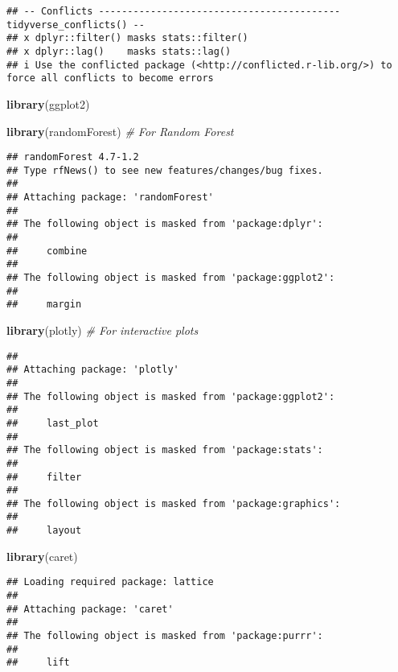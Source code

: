 \documentclass[
]{article}
\newenvironment{Shaded}{\begin{snugshade}}{\end{snugshade}}
\newcommand{\CommentTok}[1]{\textcolor[rgb]{0.56,0.35,0.01}{\textit{#1}}}
\newcommand{\FunctionTok}[1]{\textcolor[rgb]{0.13,0.29,0.53}{\textbf{#1}}}
\newcommand{\NormalTok}[1]{#1}
\begin{document}
\begin{verbatim}
## -- Conflicts ------------------------------------------ tidyverse_conflicts() --
## x dplyr::filter() masks stats::filter()
## x dplyr::lag()    masks stats::lag()
## i Use the conflicted package (<http://conflicted.r-lib.org/>) to force all conflicts to become errors
\end{verbatim}

\begin{Shaded}
\begin{Highlighting}[]
\FunctionTok{library}\NormalTok{(ggplot2)}

\FunctionTok{library}\NormalTok{(randomForest)   }\CommentTok{\# For Random Forest}
\end{Highlighting}
\end{Shaded}

\begin{verbatim}
## randomForest 4.7-1.2
## Type rfNews() to see new features/changes/bug fixes.
## 
## Attaching package: 'randomForest'
## 
## The following object is masked from 'package:dplyr':
## 
##     combine
## 
## The following object is masked from 'package:ggplot2':
## 
##     margin
\end{verbatim}

\begin{Shaded}
\begin{Highlighting}[]
\FunctionTok{library}\NormalTok{(plotly)         }\CommentTok{\# For interactive plots}
\end{Highlighting}
\end{Shaded}

\begin{verbatim}
## 
## Attaching package: 'plotly'
## 
## The following object is masked from 'package:ggplot2':
## 
##     last_plot
## 
## The following object is masked from 'package:stats':
## 
##     filter
## 
## The following object is masked from 'package:graphics':
## 
##     layout
\end{verbatim}

\begin{Shaded}
\begin{Highlighting}[]
\FunctionTok{library}\NormalTok{(caret)   }
\end{Highlighting}
\end{Shaded}

\begin{verbatim}
## Loading required package: lattice
## 
## Attaching package: 'caret'
## 
## The following object is masked from 'package:purrr':
## 
##     lift
\end{verbatim}
\end{document}
